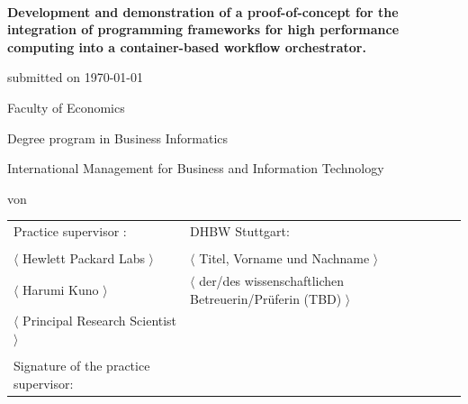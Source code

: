 \begin{spacing}{1}
\begin{center}	
~\vspace{0mm}

{\sffamily
\large  
\textbf{
    Development and demonstration of a proof-of-concept for the integration of programming frameworks for high performance computing into a container-based workflow orchestrator.
    }
\bigskip
\textbf{}
}


\vspace{15mm}

{\Large \typMeinerArbeit}

\vspace{1cm}

submitted on \today 

\vspace{15mm}

Faculty of Economics
\medskip

Degree program in Business Informatics

\medskip

International Management for Business and Information Technology 

\vspace{10mm}

von

\vspace{10mm}
    
{\large\textsc{\meinName}}

\vspace{10mm}
\end{center}

\vfill

\begin{tabular}{ll}
Practice supervisor : & DHBW Stuttgart: \\
\hspace{0.4\linewidth} & \\
$\langle$ Hewlett Packard Labs $\rangle$ & $\langle$ Titel, Vorname und Nachname $\rangle$ \\
$\langle$ Harumi Kuno $\rangle$ 
& $\langle$ der/des wissenschaftlichen Betreuerin/Prüferin (TBD) $\rangle$ \\
$\langle$ Principal Research Scientist $\rangle$ \\
\\
Signature of the practice supervisor: \\
\end{tabular}


\vspace{1cm}
\end{spacing}

